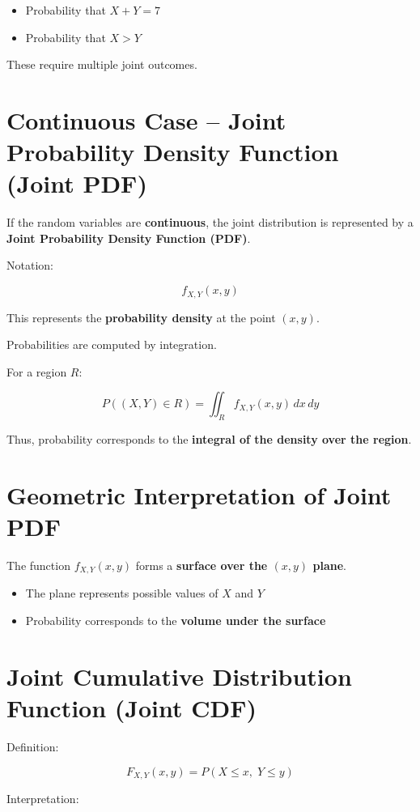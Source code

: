 \documentclass[12pt]{article}
\begin{document}
\begin{itemize}
\item Probability that $X+Y=7$
\item Probability that $X>Y$
\end{itemize}

These require multiple joint outcomes.

\section{Continuous Case -- Joint Probability Density Function (Joint PDF)}

If the random variables are \textbf{continuous}, the joint distribution is represented by a \textbf{Joint Probability Density Function (PDF)}.

Notation:

\[
f_{X,Y}(x,y)
\]

This represents the \textbf{probability density} at the point $(x,y)$.

Probabilities are computed by integration.

For a region $R$:

\[
P((X,Y)\in R) = \iint_R f_{X,Y}(x,y)\,dx\,dy
\]

Thus, probability corresponds to the \textbf{integral of the density over the region}.

\section{Geometric Interpretation of Joint PDF}

The function $f_{X,Y}(x,y)$ forms a \textbf{surface over the $(x,y)$ plane}.

\begin{itemize}
\item The plane represents possible values of $X$ and $Y$
\item Probability corresponds to the \textbf{volume under the surface}
\end{itemize}

\section{Joint Cumulative Distribution Function (Joint CDF)}

Definition:

\[
F_{X,Y}(x,y) = P(X \le x,\; Y \le y)
\]

Interpretation:
\end{document}
